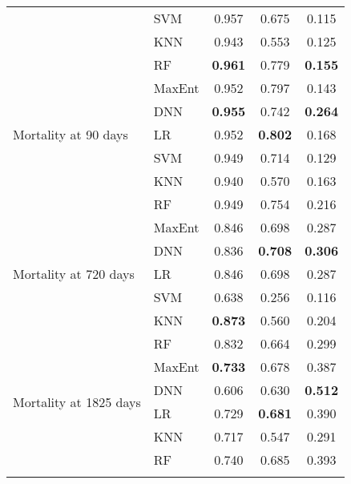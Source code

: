 \documentclass{article}
\begin{document}
\begin{table}[htbp]
\begin{tabular}{llccc}
                                                & SVM    & 0.957          & 0.675          & 0.115          \\
                                                & KNN    & 0.943          & 0.553          & 0.125          \\
                                                & RF     & \textbf{0.961} & 0.779          & \textbf{0.155} \\
        \hline
        \multirow{5}{*}{Mortality at 90 days}   & MaxEnt & 0.952          & 0.797          & 0.143          \\
                                                & DNN    & \textbf{0.955} & 0.742          & \textbf{0.264} \\
                                                & LR     & 0.952          & \textbf{0.802} & 0.168          \\
                                                & SVM    & 0.949          & 0.714          & 0.129          \\
                                                & KNN    & 0.940          & 0.570          & 0.163          \\
                                                & RF     & 0.949          & 0.754          & 0.216          \\
        \hline
        \multirow{5}{*}{Mortality at 720 days}  & MaxEnt & 0.846          & 0.698          & 0.287          \\
                                                & DNN    & 0.836          & \textbf{0.708} & \textbf{0.306} \\
                                                & LR     & 0.846          & 0.698          & 0.287          \\
                                                & SVM    & 0.638          & 0.256          & 0.116          \\
                                                & KNN    & \textbf{0.873} & 0.560          & 0.204          \\
                                                & RF     & 0.832          & 0.664          & 0.299          \\
        \hline
        \multirow{4}{*}{Mortality at 1825 days} & MaxEnt & \textbf{0.733} & 0.678          & 0.387          \\
                                                & DNN    & 0.606          & 0.630          & \textbf{0.512} \\
                                                & LR     & 0.729          & \textbf{0.681} & 0.390          \\
                                                & KNN    & 0.717          & 0.547          & 0.291          \\
                                                & RF     & 0.740          & 0.685          & 0.393          \\
        \hline
        \label{tab:final-model-hyperparameters}
    \end{tabular}
\end{table}
\end{document}
